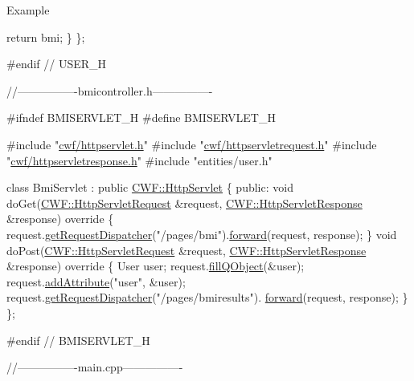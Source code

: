 \begin{DoxyParagraph}{Example}
\begin{DoxyCode}
        \textcolor{keywordflow}{return} bmi;
    \}
\};

\textcolor{preprocessor}{#endif // USER\_H}

\textcolor{comment}{//----------------bmicontroller.h----------------}

\textcolor{preprocessor}{#ifndef BMISERVLET\_H}
\textcolor{preprocessor}{#define BMISERVLET\_H}

\textcolor{preprocessor}{#include "\hyperlink{httpservlet_8h}{cwf/httpservlet.h}"}
\textcolor{preprocessor}{#include "\hyperlink{httpservletrequest_8h}{cwf/httpservletrequest.h}"}
\textcolor{preprocessor}{#include "\hyperlink{httpservletresponse_8h}{cwf/httpservletresponse.h}"}
\textcolor{preprocessor}{#include "entities/user.h"}

\textcolor{keyword}{class }BmiServlet : \textcolor{keyword}{public} \hyperlink{class_c_w_f_1_1_http_servlet}{CWF::HttpServlet}
\{
\textcolor{keyword}{public}:
    \textcolor{keywordtype}{void} doGet(\hyperlink{class_c_w_f_1_1_http_servlet_request}{CWF::HttpServletRequest} &request, 
      \hyperlink{class_c_w_f_1_1_http_servlet_response}{CWF::HttpServletResponse} &response)\textcolor{keyword}{ override}
\textcolor{keyword}{    }\{
        request.\hyperlink{class_c_w_f_1_1_http_servlet_request_a0ce93d793a178c7e0e5fef4044b48bdc}{getRequestDispatcher}(\textcolor{stringliteral}{"/pages/bmi"}).\hyperlink{class_c_w_f_1_1_request_dispatcher_a075c11ff233f217196764899f9edf7d0}{forward}(request, response);
    \}
    \textcolor{keywordtype}{void} doPost(\hyperlink{class_c_w_f_1_1_http_servlet_request}{CWF::HttpServletRequest} &request, 
      \hyperlink{class_c_w_f_1_1_http_servlet_response}{CWF::HttpServletResponse} &response)\textcolor{keyword}{ override}
\textcolor{keyword}{    }\{
        User user;
        request.\hyperlink{class_c_w_f_1_1_http_servlet_request_a82a05ddb8d91c72a28846ffc0e811ee7}{fillQObject}(&user);
        request.\hyperlink{class_c_w_f_1_1_http_servlet_request_ad4777049d7043e62535fa658fd61be1d}{addAttribute}(\textcolor{stringliteral}{"user"}, &user);
        request.\hyperlink{class_c_w_f_1_1_http_servlet_request_a0ce93d793a178c7e0e5fef4044b48bdc}{getRequestDispatcher}(\textcolor{stringliteral}{"/pages/bmiresults"}).
      \hyperlink{class_c_w_f_1_1_request_dispatcher_a075c11ff233f217196764899f9edf7d0}{forward}(request, response);
    \}
\};

\textcolor{preprocessor}{#endif // BMISERVLET\_H}

\textcolor{comment}{//----------------main.cpp----------------}


\end{DoxyCode}
\end{DoxyParagraph}
